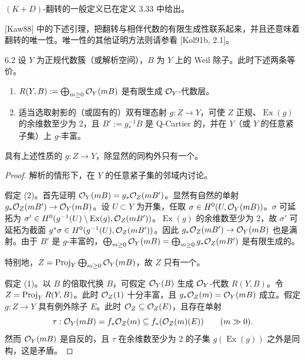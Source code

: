 $(K+D)$-翻转的一般定义已在定义 3.33 中给出。

[Kaw88] 中的下述引理，把翻转与相伴代数的有限生成性联系起来，并且还意味着翻转的唯一性。唯一性的其他证明方法则请参看 [Kol91b, 2.1]。

\begin{lemmap}{6.2}
设 $Y$ 为正规代数簇（或解析空间），$B$ 为 $Y$ 上的 Weil 除子。此时下述两条等价。

\begin{enumerate}[label=（\arabic*）,leftmargin=2.8em]
\item $R(Y,B):=\bigoplus_{m\ge0}\mathcal{O}_Y(mB)$ 是有限生成 $\mathcal{O}_Y$-代数层。
\item 适当选取射影的（或固有的）双有理态射 $g:Z\to Y$，可使 $Z$ 正规、$\operatorname{Ex}(g)$ 的余维数至少为 2，且 $B':=g_*^{-1}B$ 是 Q-Cartier 的，并在 $Y$（或 $Y$ 的任意紧子集）上 $g$-丰富。
\end{enumerate}

具有上述性质的 $g:Z\to Y$，除显然的同构外只有一个。
\end{lemmap}

\begin{proof}
解析的情形下，在 $Y$ 的任意紧子集的邻域内讨论。

假定 (2)。首先证明 $\mathcal{O}_Y(mB)=g_*\mathcal{O}_Z(mB')$。显然有自然的单射 $g_*\mathcal{O}_Z(mB')\to\mathcal{O}_Y(mB)$。设 $U\subset Y$ 为开集，任取 $\sigma\in H^0(U,\mathcal{O}_Y(mB))$。$\sigma$ 可延拓为 $\sigma'\in H^0(g^{-1}(U)\setminus\operatorname{Ex}(g),\mathcal{O}_Z(mB'))$。$\operatorname{Ex}(g)$ 的余维数至少为 2，故 $\sigma'$ 可延拓为截面 $g^*\sigma\in H^0(g^{-1}(U),\mathcal{O}_Z(mB'))$。因此 $g_*\mathcal{O}_Z(mB')\to\mathcal{O}_Y(mB)$ 也是满射。由于 $B'$ 是 $g$-丰富的，$\bigoplus_{m\ge0}\mathcal{O}_Y(mB)=\bigoplus_{m\ge0}g_*\mathcal{O}_Z(mB')$ 是有限生成的。

特别地，$Z=\operatorname{Proj}_Y\bigoplus_{m\ge0}\mathcal{O}_Y(mB)$，故 $Z$ 只有一个。

假定 (1)。以 $B$ 的倍取代换 $B$，可假定 $\mathcal{O}_Y(B)$ 生成 $\mathcal{O}_Y$-代数 $R(Y,B)$。令 $Z=\operatorname{Proj}_Y R(Y,B)$。此时 $\mathcal{O}_Z(1)$ 十分丰富，且 $g_*\mathcal{O}_Z(m)=\mathcal{O}_Y(mB)$ 成立。假定 $g:Z\to Y$ 具有例外除子 $E$。此时 $\mathcal{O}_Z\subseteq\mathcal{O}_Z(E)$，且存在单射
\[
\tau:\mathcal{O}_Y(mB)=f_*\mathcal{O}_Z(m)\subseteq f_*(\mathcal{O}_Z(m)(E))\qquad(m\gg0).
\]
然而 $\mathcal{O}_Y(mB)$ 是自反的，且 $\tau$ 在余维数至少为 2 的子集 $g(\operatorname{Ex}(g))$ 之外是同构，这是矛盾。
\end{proof}


